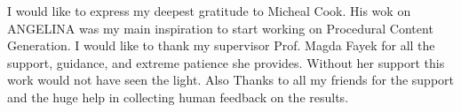 I would like to express my deepest gratitude to Micheal Cook. His wok on ANGELINA was my main inspiration to start working on Procedural Content Generation. I would like to thank my supervisor Prof. Magda Fayek for all the support, guidance, and extreme patience she provides. Without her support this work would not have seen the light. Also Thanks to all my friends for the support and the huge help in collecting human feedback on the results.